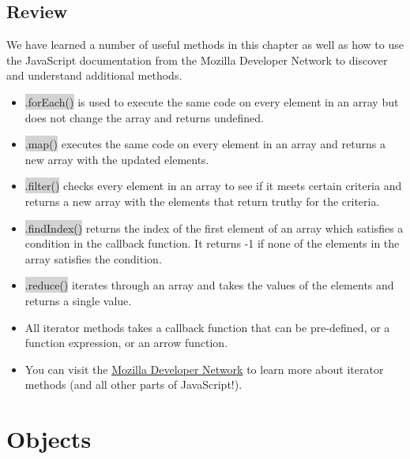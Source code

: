 \documentclass[11pt]{article}
\begin{document}
\subsection{Review}
We have learned a number of useful methods in this chapter as well as how to use the JavaScript documentation from the Mozilla Developer Network to discover and understand additional methods. 
\begin{itemize}[leftmargin = *]
\item \colorbox{lightgray}{.forEach()} is used to execute the same code on every element in an array but does not change the array and returns undefined.
\item \colorbox{lightgray}{.map()} executes the same code on every element in an array and returns a new array with the updated elements.
\item \colorbox{lightgray}{.filter()} checks every element in an array to see if it meets certain criteria and returns a new array with the elements that return truthy for the criteria.
\item \colorbox{lightgray}{.findIndex()} returns the index of the first element of an array which satisfies a condition in the callback function. It returns -1 if none of the elements in the array satisfies the condition.
\item \colorbox{lightgray}{.reduce()} iterates through an array and takes the values of the elements and returns a single value.
\item All iterator methods takes a callback function that can be pre-defined, or a function expression, or an arrow function.
\item You can visit the \href{https://developer.mozilla.org/en-US/docs/Web/JavaScript/Reference/Global_Objects/Array}{Mozilla Developer Network} to learn more about iterator methods (and all other parts of JavaScript!).
\end{itemize}

\newpage
\section{Objects}
\end{document}
